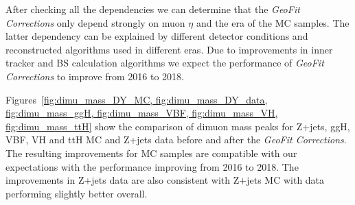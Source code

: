 
    

    

    

After checking all the dependencies we can determine that the \textit{GeoFit Corrections} only depend strongly on muon $\eta$ and the era of the MC samples. The latter dependency can be explained by different detector conditions and reconstructed algorithms used in different eras. Due to improvements in inner tracker and BS calculation algorithms we expect the performance of \textit{GeoFit Corrections} to improve from 2016 to 2018. 

Figures~\ref{fig:dimu_mass_DY_MC, fig:dimu_mass_DY_data, fig:dimu_mass_ggH, fig:dimu_mass_VBF, fig:dimu_mass_VH, fig:dimu_mass_ttH} show the comparison of dimuon mass peaks for Z+jets, ggH, VBF, VH and ttH MC and Z+jets data before and after the \textit{GeoFit Corrections}. The resulting improvements for MC samples are compatible with our expectations with the performance improving from 2016 to 2018. The improvements in Z+jets data are also consistent with Z+jets MC with data performing slightly better overall. 

